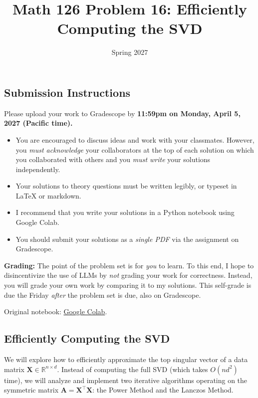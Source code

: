 \documentclass{article}
\title{Math 126 Problem 16: Efficiently Computing the SVD}
\author{} %
\date{Spring 2027}
\begin{document}
\maketitle

\hypertarget{submission-instructions}{%
\subsection*{Submission Instructions}\label{submission-instructions}}

Please upload your work to Gradescope by \textbf{11:59pm on Monday, April 5, 2027 (Pacific time).}

\begin{itemize}
\item
  You are encouraged to discuss ideas and work with your classmates. However, you \emph{must acknowledge} your collaborators at the top of each solution on which you collaborated with others and you \emph{must write} your solutions independently.
\item
  Your solutions to theory questions must be written legibly, or typeset in LaTeX or markdown.
\item
  I recommend that you write your solutions in a Python notebook using Google Colab.
\item
  You should submit your solutions as a \emph{single PDF} via the assignment on Gradescope.
\end{itemize}

\textbf{Grading:} The point of the problem set is for \emph{you} to learn. To this end, I hope to disincentivize the use of LLMs by \emph{not} grading your work for correctness. Instead, you will grade your own work by comparing it to my solutions. This self-grade is due the Friday \emph{after} the problem set is due, also on Gradescope.

\noindent Original notebook: \href{https://colab.research.google.com/drive/10fug5ckPaH6QQvK16XiD74eFa-VBHqmW?usp=sharing}{Google Colab}.

\hypertarget{efficiently-computing-the-svd}{%
\subsection*{Efficiently Computing the SVD}\label{efficiently-computing-the-svd}}

We will explore how to efficiently approximate the top singular vector of a data matrix \(\mathbf{X} \in \mathbb{R}^{n \times d}\). Instead of computing the full SVD (which takes \(O(nd^2)\) time), we will analyze and implement two iterative algorithms operating on the symmetric matrix \(\mathbf{A} = \mathbf{X}^\top \mathbf{X}\): the Power Method and the Lanczos Method.
\end{document}
